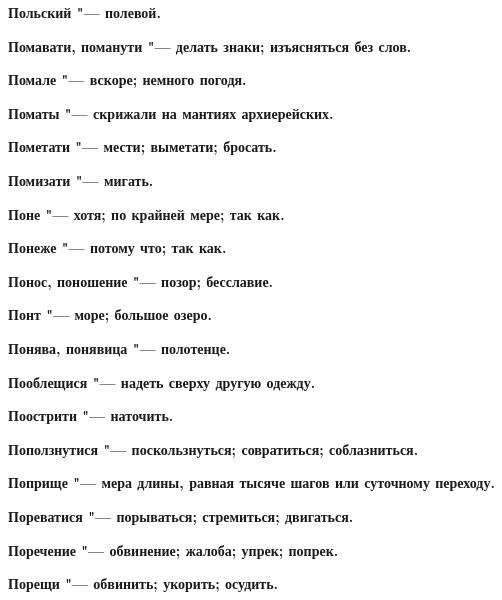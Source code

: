 \begin{mymulticols}{2}
\bfseries Польский\normalfont{} "--- полевой. 




\bfseries Помавати, поманути\normalfont{} "--- делать знаки; изъясняться без слов. 




\bfseries Помале\normalfont{} "--- вскоре; немного погодя. 




\bfseries Поматы\normalfont{} "--- скрижали на мантиях архиерейских. 




\bfseries Пометати\normalfont{} "--- мести; выметати; бросать. 




\bfseries Помизати\normalfont{} "--- мигать. 




\bfseries Поне\normalfont{} "--- хотя; по крайней мере; так как. 




\bfseries Понеже\normalfont{} "--- потому что; так как. 




\bfseries Понос, поношение\normalfont{} "--- позор; бесславие. 




\bfseries Понт\normalfont{} "--- море; большое озеро. 




\bfseries Понява, понявица\normalfont{} "--- полотенце. 




\bfseries Пооблещися\normalfont{} "--- надеть сверху другую одежду. 




\bfseries Поострити\normalfont{} "--- наточить. 




\bfseries Поползнутися\normalfont{} "--- поскользнуться; совратиться; соблазниться. 




\bfseries Поприще\normalfont{} "--- мера длины, равная тысяче шагов или суточному переходу. 




\bfseries Пореватися\normalfont{} "--- порываться; стремиться; двигаться. 




\bfseries Поречение\normalfont{} "--- обвинение; жалоба; упрек; попрек. 




\bfseries Порещи\normalfont{} "--- обвинить; укорить; осудить. 





\end{mymulticols}
